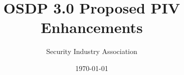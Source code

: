 \documentclass{tex/osdp-report}
\begin{document}
\title{OSDP 3.0 Proposed PIV Enhancements}
\author{Security Industry Association}
\date{\today}
\maketitle

\tableofcontents
\clearpage





\appendix




\end{document}
